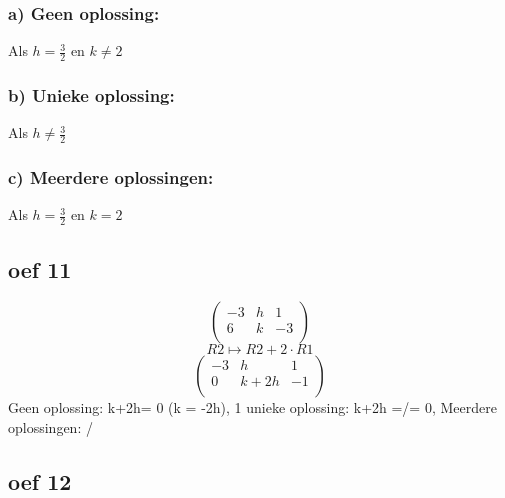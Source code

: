 \documentclass[10pt,a4paper]{article}
\begin{document}
\subsubsection*{a) Geen oplossing:}
Als $h = \frac{3}{2}$ en $k \neq 2$
\subsubsection*{b) Unieke oplossing:}
Als $h \neq \frac{3}{2}$
\subsubsection*{c) Meerdere oplossingen:}
Als $h = \frac{3}{2}$ en $k = 2$
\subsection*{oef 11}
\[
\begin{pmatrix}
-3 &  h &  1\\
6 &  k &  -3\\
\end{pmatrix}
\]
\[R2 \longmapsto R2 + 2\cdot R1\]
\[
\begin{pmatrix}
-3 &  h &  1\\
0 &  k+2h &  -1\\
\end{pmatrix}
\]
Geen oplossing: k+2h= 0 (k = -2h), 
1 unieke oplossing: k+2h =/= 0, 
Meerdere oplossingen: /


\subsection*{oef 12}
\end{document}
